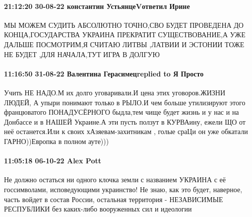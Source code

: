 \paragraph{21:12:20 30-08-22 константин УстьянцеVответил Ирине}

МЫ МОЖЕМ СУДИТЬ АБСОЛЮТНО ТОЧНО,СВО БУДЕТ ПРОВЕДЕНА ДО КОНЦА,ГОСУДАРСТВА
УКРАИНА ПРЕКРАТИТ СУЩЕСТВОВАНИЕ,А УЖЕ ДАЛЬШЕ ПОСМОТРИМ,Я СЧИТАЮ ЛИТВЫ ,ЛАТВИИ И
ЭСТОНИИ ТОЖЕ НЕ БУДЕТ ,ДЛЯ НАЧАЛА,ТУТ ИГРА В ДОЛГУЮ


\paragraph{11:16:50 31-08-22 Валентина Герасимецreplied to Я Просто}

Учить НЕ НАДО.М их долго уговаривали.И цена этих уговоров.ЖИЗНИ ЛЮДЕЙ, А упыри
понимают только в РЫЛО.И чем больше утилизируют этого францюватого
ПОНАДУСЁРНОГО быдла,тем чище будет жизнь и у нас и на Донбассе и в НАШЕЙ
Украине.А эти пусть ползут в КУРВАину, ежели ЩО от неё останется.Или к своих
хАзяевам-захитникам , голые сраЦи он уже обкатали ГАРНО))Европка в полном
ауте)))

\paragraph{11:05:18 06-10-22 Alex Pott}

Не должно остаться ни одного клочка земли с названием УКРАИНА с её
госсимволами, исповедующими украинство! Не знаю, как это будет, наверное, часть
войдет в состав России, остальная территория - НЕЗАВИСИМЫЕ РЕСПУБЛИКИ без
каких-либо вооруженных сил и идеологии


